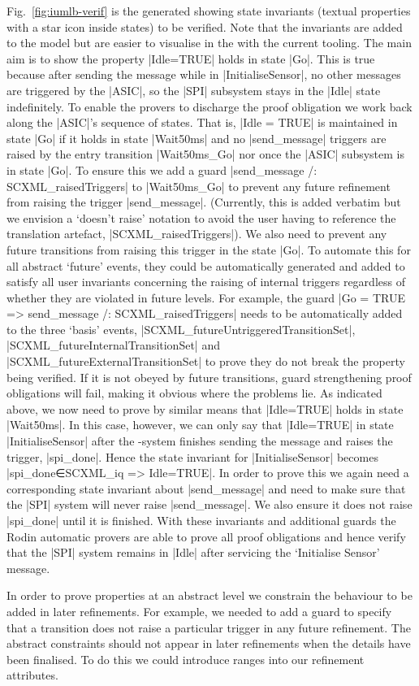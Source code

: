 Fig.~\ref{fig:iumlb-verif} is the generated \iUMLB showing state invariants (textual properties with a star icon inside states) to be verified. Note that the invariants are added to the \SCXML model but are easier to visualise in the \iUMLB with the current tooling.
The main aim is to show the property |Idle=TRUE| holds in state |Go|. 
This is true because after sending the message while in |InitialiseSensor|, no other messages are triggered by the |ASIC|, so the |SPI| subsystem stays in the |Idle| state indefinitely. 
To enable the provers to discharge the proof obligation we work back along the |ASIC|'s sequence of states. 
That is, |Idle = TRUE| is maintained in state |Go| if it holds in state |Wait50ms| and no |send_message| triggers are raised by the entry transition |Wait50ms_Go| nor once the |ASIC| subsystem is in state |Go|. 
To ensure this we add a guard |send_message /: SCXML_raisedTriggers| to |Wait50ms_Go| to prevent any future refinement from raising the trigger |send_message|.
(Currently, this is added verbatim but we envision a `doesn't raise' notation to avoid the user having to reference the translation artefact, |SCXML_raisedTriggers|).
We also need to prevent any future transitions from raising this trigger in the state |Go|.
To automate this for all abstract `future' events, they could be automatically generated and added to satisfy all user invariants concerning the raising of internal triggers regardless of whether they are violated in future levels. 
For example, the guard  |Go = TRUE => send_message /: SCXML_raisedTriggers| needs to be automatically added to the three `basis' events, |SCXML_futureUntriggeredTransitionSet|, |SCXML_futureInternalTransitionSet| and |SCXML_futureExternalTransitionSet| to prove they do not break the property being verified. 
If it is not obeyed by future transitions, guard strengthening proof obligations will fail, making it obvious where the problems lie.
As indicated above, we now need to prove by similar means that |Idle=TRUE| holds in state |Wait50ms|. 
In this case, however, we can only say that |Idle=TRUE| in state |InitialiseSensor| after the \SPI-system finishes sending the message and raises the trigger, |spi_done|. 
Hence the state invariant for |InitialiseSensor| becomes |spi_done∈SCXML_iq => Idle=TRUE|. 
In order to prove this we again need a corresponding state invariant about |send_message| and need to make sure that the |SPI| system will never raise |send_message|.
We also ensure it does not raise |spi_done| until it is finished. 
With these invariants and additional guards the Rodin automatic provers are able to prove all proof obligations and hence verify that the |SPI| system remains in |Idle| after servicing the `Initialise Sensor' message.

In order to prove properties at an abstract level we constrain the behaviour to be added in later refinements. 
For example, we needed to add a guard to specify that a transition does not raise a particular trigger in any future refinement. 
The abstract constraints should not appear in later refinements when the details have been finalised. To do this we could introduce ranges into our refinement attributes.

